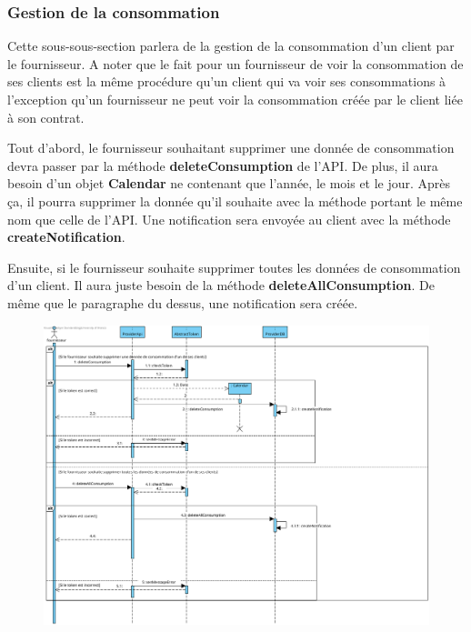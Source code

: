 \newpage
\subsubsection{Gestion de la consommation}
\begin{flushleft}
Cette sous-sous-section parlera de la gestion de la consommation d'un client par le fournisseur. A noter que le fait pour un fournisseur de voir la consommation de ses clients est la même procédure qu'un client qui va voir ses consommations à l'exception qu'un fournisseur ne peut voir la consommation créée par le client liée à son contrat.     
\end{flushleft}

\begin{flushleft}
Tout d'abord, le fournisseur souhaitant supprimer une donnée de consommation devra passer par la méthode \textbf{deleteConsumption} de l'API. De plus, il aura besoin d'un objet \textbf{Calendar} ne contenant que l'année, le mois et le jour. Après ça, il pourra supprimer la donnée qu'il souhaite avec la méthode portant le même nom que celle de l'API. Une notification sera envoyée au client avec la méthode \textbf{createNotification}.
\end{flushleft}

\begin{flushleft}
Ensuite, si le fournisseur souhaite supprimer toutes les données de consommation d'un client. Il aura juste besoin de la méthode \textbf{deleteAllConsumption}. De même que le paragraphe du dessus, une notification sera créée.
\end{flushleft}

\begin{figure}[h]
    \centering
    \includegraphics[height = 0.8\textwidth]{Base/sequence/img/fournisseur/gestion de la consommation.png}
\end{figure}
